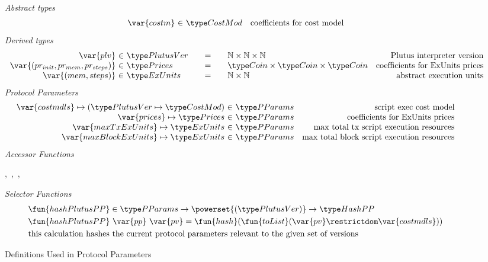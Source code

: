 \begin{figure*}[htb]
  \emph{Abstract types}
  \begin{equation*}
    \begin{array}{r@{~\in~}lr}
      \var{costm} & \CostMod & \text{coefficients for cost model} \\
    \end{array}
  \end{equation*}
  \emph{Derived types}
  \begin{equation*}
    \begin{array}{r@{~\in~}l@{\qquad=\qquad}lr}
      \var{plv} & \PlutusVer
      & \N \times \N \times \N
      & \text{Plutus interpreter version}
      \\
      \var{(pr_{init}, pr_{mem}, pr_{steps})}
      & \Prices
      & \Coin \times \Coin \times \Coin
      & \text {coefficients for ExUnits prices}
      \\
      \var{(mem, steps)}
      & \ExUnits
      & \N \times \N
      & \text{abstract execution units} \\
    \end{array}
  \end{equation*}
  \emph{Protocol Parameters}
  \begin{equation*}
      \begin{array}{r@{~\in~}lr}
        \var{costmdls} \mapsto (\PlutusVer \mapsto \CostMod) & \PParams & \text{script exec cost model}\\
        \var{prices} \mapsto \Prices & \PParams & \text{coefficients for ExUnits prices} \\
        \var{maxTxExUnits} \mapsto \ExUnits & \PParams & \text{max total tx script execution resources}\\
        \var{maxBlockExUnits} \mapsto \ExUnits & \PParams & \text{max total block script execution resources}\\
      \end{array}
  \end{equation*}
  \emph{Accessor Functions}
  \begin{center}
  ,~,~,~
  \end{center}
  \emph{Selector Functions}
  \begin{align*}
    & \fun{hashPlutusPP} \in \PParams \to \powerset{(\PlutusVer)} \to \HashPP   \\
    & \fun{hashPlutusPP}~\var{pp}~\var{pv} = \fun{hash} (\fun{toList} (\var{pv} \restrictdom \var{costmdls})) \\
    & \text{this calculation hashes the current protocol parameters relevant to
    the given set of versions}
  \end{align*}
  \caption{Definitions Used in Protocol Parameters}
  \label{fig:defs:protocol-parameters}
\end{figure*}


\clearpage
